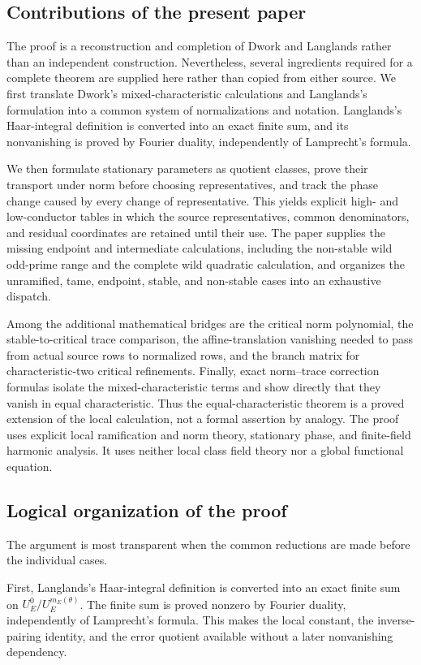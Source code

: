 \documentclass[11pt]{amsart}
\theoremstyle{definition}
\theoremstyle{remark}
\begin{document}
\subsection*{Contributions of the present paper}
The proof is a reconstruction and completion of Dwork and Langlands
rather than an independent construction.  Nevertheless, several
ingredients required for a complete theorem are supplied here rather
than copied from either source.  We first translate Dwork's
mixed-characteristic calculations and Langlands's formulation into a
common system of normalizations and notation.  Langlands's Haar-integral
definition is converted into an exact finite sum, and its nonvanishing
is proved by Fourier duality, independently of Lamprecht's formula.

We then formulate stationary parameters as quotient classes, prove
their transport under norm before choosing representatives, and track
the phase change caused by every change of representative.  This yields
explicit high- and low-conductor tables in which the source
representatives, common denominators, and residual coordinates are
retained until their use.  The paper supplies the missing endpoint and
intermediate calculations, including the non-stable wild odd-prime
range and the complete wild quadratic calculation, and organizes the
unramified, tame, endpoint, stable, and non-stable cases into an
exhaustive dispatch.

Among the additional mathematical bridges are the critical norm
polynomial, the stable-to-critical trace comparison, the
affine-translation vanishing needed to pass from actual source rows to
normalized rows, and the branch matrix for characteristic-two critical
refinements.  Finally, exact norm--trace correction formulas isolate
the mixed-characteristic terms and show directly that they vanish in
equal characteristic.  Thus the equal-characteristic theorem is a
proved extension of the local calculation, not a formal assertion by
analogy.  The proof uses explicit local ramification and norm theory,
stationary phase, and finite-field harmonic analysis.  It uses neither
local class field theory nor a global functional equation.

\subsection*{Logical organization of the proof}
The argument is most transparent when the common reductions are made
before the individual cases.

First, Langlands's Haar-integral definition is converted into an exact
finite sum on $U_E^0/U_E^{m_E(\theta)}$.  The finite sum is proved
nonzero by Fourier duality, independently of Lamprecht's formula.  This
makes the local constant, the inverse-pairing identity, and the error
quotient available without a later nonvanishing dependency.
\end{document}
